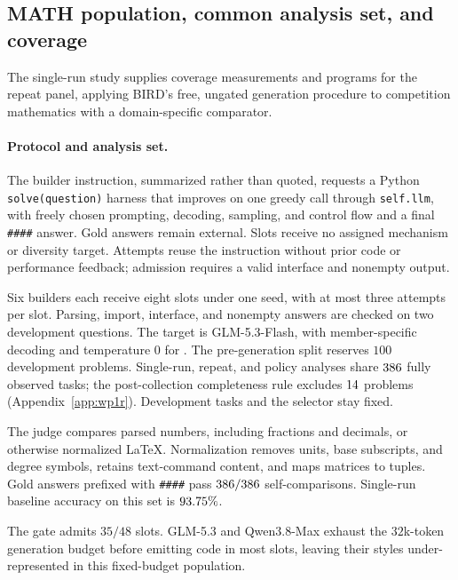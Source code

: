 \subsection{MATH population, common analysis set, and coverage}\label{app:crossdomain}
The single-run study supplies coverage measurements and programs for the
repeat panel, applying BIRD's free, ungated generation procedure to
competition mathematics with a domain-specific comparator.

\paragraph{Protocol and analysis set.}
\label{app:builder-instruction}
The builder instruction, summarized rather than quoted, requests a Python
\texttt{solve(question)} harness that improves on one greedy call through
\texttt{self.llm}, with freely chosen prompting, decoding, sampling, and
control flow and a final \texttt{\#\#\#\#} answer. Gold answers remain
external. Slots receive no assigned mechanism or diversity target.
Attempts reuse the instruction without prior code or performance
feedback; admission requires a valid interface and nonempty output.

Six builders each receive eight slots under one seed, with at most three
attempts per slot. Parsing, import, interface, and nonempty answers are
checked on two development questions. The target is GLM-5.3-Flash, with
member-specific decoding and temperature $0$ for \bare{}. The
pre-generation split reserves $100$ development problems. Single-run,
repeat, and policy analyses share $386$ fully observed tasks;
the post-collection completeness rule excludes $14$ problems
(Appendix~\ref{app:wp1r}). Development tasks and the selector stay fixed.

The judge compares parsed numbers, including fractions and decimals,
or otherwise normalized LaTeX. Normalization removes units, base
subscripts, and degree symbols, retains text-command content, and maps
matrices to tuples. Gold answers prefixed with \texttt{\#\#\#\#} pass
$386/386$ self-comparisons. Single-run baseline accuracy
on this set is $93.75\%$.

The gate admits $35/48$ slots. GLM-5.3 and Qwen3.8-Max exhaust the
$32$k-token generation budget before emitting code in most slots,
leaving their styles under-represented in this fixed-budget population.


